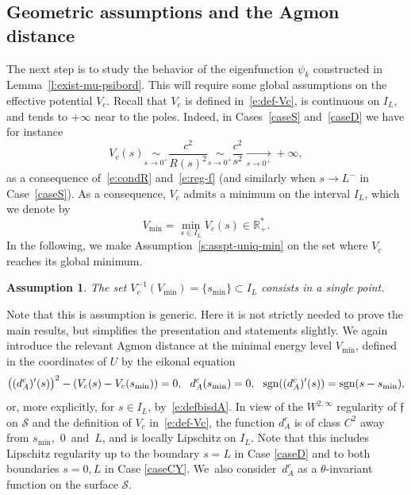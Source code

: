 \documentclass[10pt]{amsart}
\newtheorem{assumption}[lemma]{Assumption}
\theoremstyle{definition}
\newcommand{\calS}{\ensuremath{\mathcal S}}
\newcommand{\mb}[1]{\ensuremath{\mathbb{#1}}}
\newcommand{\R}{{\mb{R}}}
\newcommand{\f}{\ensuremath{\mathfrak{f}}}
\newcommand\sgn{\textnormal{sgn}}
\newcommand{\ce}{c}
\begin{document}
\subsection{Geometric assumptions and the Agmon distance}
The next step is to study the behavior of the eigenfunction $\psi_k$ constructed in Lemma~\ref{l:exist-mu-psibord}. This will require some global assumptions on the effective potential $V_\ce$. Recall that $V_\ce$ is defined in~\eqref{e:def-Vc}, is continuous on $I_L$, and tends to $+\infty$ near to the poles. Indeed, in Cases~\ref{caseS} and~\ref{caseD} we have for instance
\[
V_c(s)\underset{s\to 0^+}\sim\frac{c^2}{R(s)^2}\underset{s\to 0^+}\sim \frac{c^2}{s^2} \underset{s\to 0^+}\to +\infty,
\]
as a consequence of~\eqref{e:condR} and~\eqref{e:reg-f} (and similarly when $s\to L^-$ in Case~\ref{caseS}).
As a consequence, $V_\ce$ admits a minimum on the interval $I_L$, which we denote by
\[
V_{\min} = \min_{s \in I_L} V_\ce(s) \in \R_+^*.
\]
In the following, we make Assumption~\eqref{s:asspt-uniq-min} on the set where $V_\ce$ reaches its global minimum.
\begin{assumption}
\label{a:single-min}
The set $V_{\ce}^{-1}(V_{\min}) = \{s_{\min}\} \subset I_L$ consists in a single point.
\end{assumption}
Note that this is assumption is generic. Here it is not strictly needed to prove the main results, but simplifies the presentation and statements slightly.
We again introduce the relevant Agmon distance at the minimal energy level $V_{\min}$, defined in the coordinates of $U$ by the eikonal equation
\[
\big((d_A^{\ce})'(s) \big)^2-\left( V_\ce(s)- V_\ce(s_{\min}) \right) = 0, \ \ d_A^{\ce}(s_{\min})=0, \ \ \sgn((d_A^{\ce})'(s)) =\sgn(s-s_{\min}),
\]
or, more explicitly, for $s\in I_L$, by~\eqref{e:defbisdA}.
In view of the $W^{2,\infty}$ regularity of $\f$ on $\calS$ and the definition of $V_\ce$ in~\eqref{e:def-Vc}, the function $d_A^{\ce}$ is of class $C^2$ away from $s_{\min}$,~$0$~and~$L$, and is locally Lipschitz on $I_L$. Note that this includes Lipschitz regularity up to the boundary $s=L$ in Case \ref{caseD} and to both boundaries $s=0,L$ in Case \ref{caseCY}.
We~also consider~$d_A^{\ce}$ as a $\theta$-invariant function on the surface $\calS$.
\end{document}
